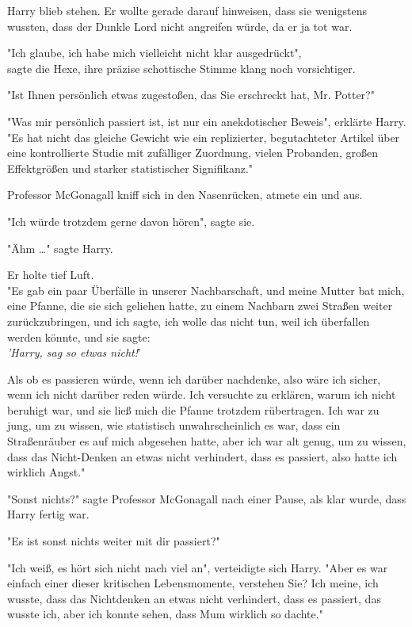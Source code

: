 {Harry blieb stehen. Er wollte gerade darauf hinweisen, dass sie wenigstens wussten, dass der Dunkle Lord nicht angreifen würde, da er ja tot war.

"Ich glaube, ich habe mich vielleicht nicht klar ausgedrückt",\\ sagte die Hexe, ihre präzise schottische Stimme klang noch vorsichtiger.

"Ist Ihnen persönlich etwas zugestoßen, das Sie erschreckt hat, Mr. Potter?"

"Was mir persönlich passiert ist, ist nur ein anekdotischer Beweis", erklärte Harry. "Es hat nicht das gleiche Gewicht wie ein replizierter, begutachteter Artikel über eine kontrollierte Studie mit zufälliger Zuordnung, vielen Probanden, großen Effektgrößen und starker statistischer Signifikanz."

Professor McGonagall kniff sich in den Nasenrücken, atmete ein und aus.

"Ich würde trotzdem gerne davon hören", sagte sie.

"Ähm …" sagte Harry.

Er holte tief Luft.\\ "Es gab ein paar Überfälle in unserer Nachbarschaft, und meine Mutter bat mich, eine Pfanne, die sie sich geliehen hatte, zu einem Nachbarn zwei Straßen weiter zurückzubringen, und ich sagte, ich wolle das nicht tun, weil ich überfallen werden könnte, und sie sagte:\\ \emph{'Harry, sag so etwas nicht!}'

Als ob es passieren würde, wenn ich darüber nachdenke, also wäre ich sicher, wenn ich nicht darüber reden würde. Ich versuchte zu erklären, warum ich nicht beruhigt war, und sie ließ mich die Pfanne trotzdem rübertragen. Ich war zu jung, um zu wissen, wie statistisch unwahrscheinlich es war, dass ein Straßenräuber es auf mich abgesehen hatte, aber ich war alt genug, um zu wissen, dass das Nicht-Denken an etwas nicht verhindert, dass es passiert, also hatte ich wirklich Angst."

"Sonst nichts?" sagte Professor McGonagall nach einer Pause, als klar wurde, dass Harry fertig war.

"Es ist sonst nichts weiter mit dir passiert?"

"Ich weiß, es hört sich nicht nach viel an", verteidigte sich Harry. "Aber es war einfach einer dieser kritischen Lebensmomente, verstehen Sie? Ich meine, ich wusste, dass das Nichtdenken an etwas nicht verhindert, dass es passiert, das wusste ich, aber ich konnte sehen, dass Mum wirklich so dachte."

}
